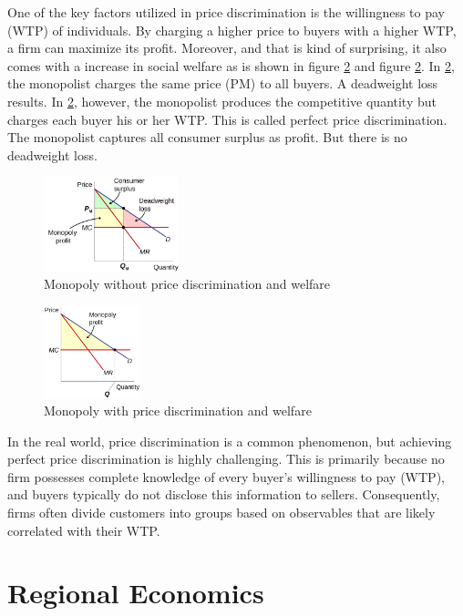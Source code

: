 \documentclass[
  12pt,
  oneside]{book}
\theoremstyle{definition}
\theoremstyle{definition}
\theoremstyle{definition}
\theoremstyle{definition}
\theoremstyle{remark}
\begin{document}
One of the key factors utilized in price discrimination is the willingness to pay (WTP) of individuals. By charging a higher price to buyers with a higher WTP, a firm can maximize its profit. Moreover, and that is kind of surprising, it also comes with a increase in social welfare as is shown in figure \ref{fig:monowpd} and figure \ref{fig:monowpd}. In \ref{fig:monowpd}, the monopolist charges the same price (PM) to all buyers. A deadweight loss results. In \ref{fig:monowpd}, however, the monopolist produces the competitive quantity but charges each buyer his or her WTP. This is called perfect price discrimination. The monopolist captures all consumer surplus as profit. But there is no deadweight loss.

\begin{figure}
\centering
\includegraphics[width=0.35\textwidth,height=\textheight]{fig/discrimination.png}
\caption{\label{fig:monowoutpd} Monopoly without price discrimination and welfare}
\end{figure}

\begin{figure}
\centering
\includegraphics[width=0.25\textwidth,height=\textheight]{fig/discrimination2.png}
\caption{\label{fig:monowpd} Monopoly with price discrimination and welfare}
\end{figure}

In the real world, price discrimination is a common phenomenon, but achieving perfect price discrimination is highly challenging. This is primarily because no firm possesses complete knowledge of every buyer's willingness to pay (WTP), and buyers typically do not disclose this information to sellers. Consequently, firms often divide customers into groups based on observables that are likely correlated with their WTP.

\hypertarget{regional-economics}{%
\section{Regional Economics}\label{regional-economics}}
\end{document}
